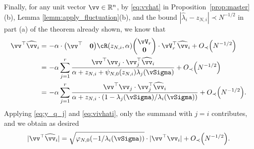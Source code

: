 \begin{proof-of-theorem}
Finally, for any unit vector $\vv \in \R^n$, by \eqref{eq:vvhat} in
Proposition~\ref{prop:master}(b),
Lemma \ref{lemm:apply_fluctuation}(b), and the bound
$|\widehat\lambda_i-z_{N,i}| \prec N^{-1/2}$ in part (a) of the theorem
already shown, we know that 
\begin{align*}
\vv^\top\widehat{\vv}_i =~& {-}\alpha \cdot \begin{pmatrix} \vv^\top & \mathbf{0}
\end{pmatrix}
\vcR(z_{N,i},\alpha)\begin{pmatrix} \vV_r \\ \mathbf{0} \end{pmatrix}
\cdot \vV_r^\top\widehat{\vv}_i+\SD{N^{-1/2}}\\
=~& {-}\alpha
\sum_{j=1}^r\frac{\vv^\top\vv_j\cdot\vv_j^\top\widehat{\vv}_i}{\alpha+z_{N,i}+\psi_{N,0}(z_{N,i})\lambda_j(\vSigma)}+\SD{N^{-1/2}} \\
=~& {-}\alpha \sum_{j=1}^r
\frac{\vv^\top\vv_j\cdot\vv_j^\top\widehat{\vv}_i}{\alpha+z_{N,i}\cdot(1-\lambda_j(\vSigma)/\lambda_i(\vSigma))}+\SD{N^{-1/2}}.
\end{align*}
Applying \eqref{eq:y_q_j} and \eqref{eq:vivhati}, only the summand with $j=i$
contributes, and we obtain as desired
\[|\vv^\top \widehat\vv_i|=\sqrt{\varphi_{N,0}({-}1/\lambda_i(\vSigma))}
\cdot |\vv^\top \vv_i|+\SD{N^{-1/2}}.\]
\end{proof-of-theorem}

